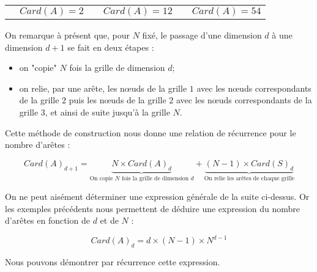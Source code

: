 \begin{center}
\begin{tabular}{cccccc}
 & $Card(A) = 2$ & & $Card(A) = 12$ & & $Card(A) = 54$ \\


\end{tabular}

\end{center}

On remarque à présent que, pour $N$ fixé, le passage d'une dimension $d$ à une dimension $d+1$ se fait en deux étapes :
\begin{itemize}
\item on "copie" $N$ fois la grille de dimension $d$;
\item on relie, par une arête, les nœuds de la grille $1$ avec les nœuds correspondants de la grille $2$ puis les nœuds de la grille $2$ avec les nœuds correspondants de la grille $3$, et ainsi de suite jusqu'à la grille $N$.
\end{itemize}

Cette méthode de construction nous donne une relation de récurrence pour le nombre d'arêtes : 

$$Card(A)_{d+1} = \underbrace{N \times Card(A)_d}_{\text{On copie }N\text{ fois la grille de dimension }d} + \underbrace{(N-1)\times Card(S)_d}_{\text{On relie les arêtes de chaque grille}}$$

On ne peut aisément déterminer une expression générale de la suite ci-dessus. Or les exemples précédents nous permettent de déduire une expression du nombre d'arêtes en fonction de $d$ et de $N$ : 

$$Card(A)_d = d\times (N-1)\times N^{d-1}$$

Nous pouvons démontrer par récurrence cette expression.

